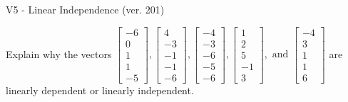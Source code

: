 \begin{exercise}
  \begin{exerciseTitle}V5 - Linear Independence (ver. 201)\end{exerciseTitle}
  \begin{exerciseStatement}
    Explain why the vectors \(\left[\begin{array}{r}
-6 \\
0 \\
1 \\
1 \\
-5
\end{array}\right] , \left[\begin{array}{r}
4 \\
-3 \\
-1 \\
-1 \\
-6
\end{array}\right] , \left[\begin{array}{r}
-4 \\
-3 \\
-6 \\
-5 \\
-6
\end{array}\right] , \left[\begin{array}{r}
1 \\
2 \\
5 \\
-1 \\
3
\end{array}\right] , \text{ and } \left[\begin{array}{r}
-4 \\
3 \\
1 \\
1 \\
6
\end{array}\right]\) are linearly dependent or linearly independent.	



\end{exerciseStatement}
\end{exercise}
